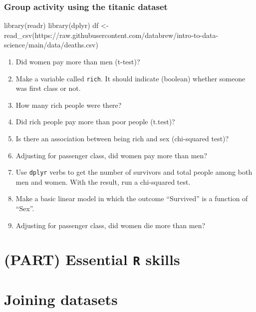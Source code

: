 \documentclass[
]{book}
\newenvironment{Shaded}{\begin{snugshade}}{\end{snugshade}}
\newcommand{\FunctionTok}[1]{\textcolor[rgb]{0.00,0.00,0.00}{#1}}
\newcommand{\NormalTok}[1]{#1}
\newcommand{\OtherTok}[1]{\textcolor[rgb]{0.56,0.35,0.01}{#1}}
\newcommand{\StringTok}[1]{\textcolor[rgb]{0.31,0.60,0.02}{#1}}
\begin{document}
\hypertarget{group-activity-using-the-titanic-dataset}{%
\subsection{Group activity using the titanic dataset}\label{group-activity-using-the-titanic-dataset}}

\begin{Shaded}
\begin{Highlighting}[]
\FunctionTok{library}\NormalTok{(readr)}
\FunctionTok{library}\NormalTok{(dplyr)}
\NormalTok{df }\OtherTok{\textless{}{-}} \FunctionTok{read\_csv}\NormalTok{(}\StringTok{\textquotesingle{}https://raw.githubusercontent.com/databrew/intro{-}to{-}data{-}science/main/data/deaths.csv\textquotesingle{}}\NormalTok{)}
\end{Highlighting}
\end{Shaded}

\begin{enumerate}
\def\labelenumi{\arabic{enumi}.}
\item
  Did women pay more than men (t-test)?
\item
  Make a variable called \texttt{rich}. It should indicate (boolean) whether someone was first class or not.
\item
  How many rich people were there?
\item
  Did rich people pay more than poor people (t.test)?
\item
  Is there an association between being rich and sex (chi-squared test)?
\item
  Adjusting for passenger class, did women pay more than men?
\item
  Use \texttt{dplyr} verbs to get the number of survivors and total people among both men and women. With the result, run a chi-squared test.
\item
  Make a basic linear model in which the outcome ``Survived'' is a function of ``Sex''.
\item
  Adjusting for passenger class, did women die more than men?
\end{enumerate}

\hypertarget{part-essential-r-skills}{%
\chapter*{\texorpdfstring{(PART) Essential \texttt{R} skills}{(PART) Essential R skills}}\label{part-essential-r-skills}}

\hypertarget{joining_datasets}{%
\chapter{Joining datasets}\label{joining_datasets}}
\end{document}
